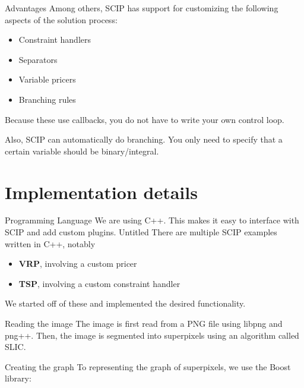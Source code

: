 \documentclass[fleqn]{beamer}
\begin{document}
    \begin{frame}{Advantages}
        Among others, SCIP has support for customizing the following aspects of the solution process:
        \begin{itemize}
            \item Constraint handlers %
            \item Separators
            \item Variable pricers
            \item Branching rules
        \end{itemize}
        Because these use callbacks, you do not have to write your own control loop.
        
        Also, SCIP can automatically do branching.
        You only need to specify that a certain variable should be binary/integral.
    \end{frame}
	
	\section{Implementation details}
    \begin{frame}{Programming Language}
        We are using C++.
        This makes it easy to interface with SCIP and add custom plugins.
        Untitled
        There are multiple SCIP examples written in C++, notably
        \begin{itemize}
            \item \textbf{VRP}, involving a custom pricer %
            \item \textbf{TSP}, involving a custom constraint handler %
        \end{itemize}
        We started off of these and implemented the desired functionality.
    \end{frame}

    \begin{frame}{Reading the image}
        The image is first read from a PNG file using libpng and png++.
        Then, the image is segmented into superpixels using an algorithm called SLIC. %
    \end{frame}
    
    \begin{frame}{Creating the graph}
        To representing the graph of superpixels, we use the Boost library:
        \inputminted[firstline=36, lastline=45]{C++}{../src/graph.h}
    \end{frame}
        
\end{document}
